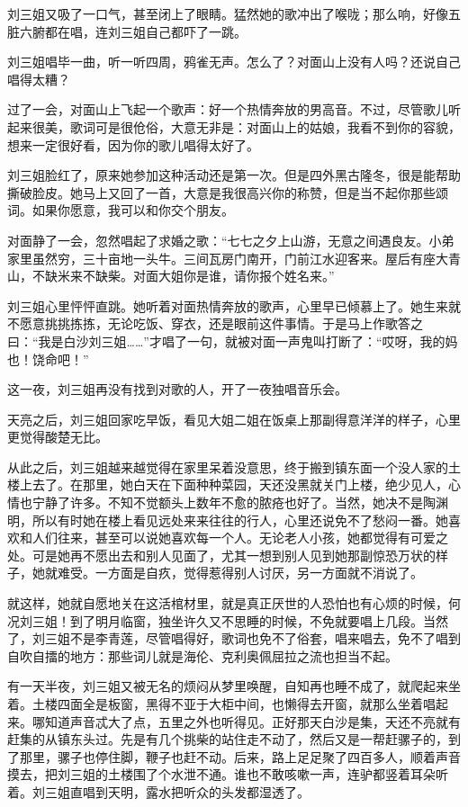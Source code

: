  刘三姐又吸了一口气，甚至闭上了眼睛。猛然她的歌冲出了喉咙；那么响，好像五脏六腑都在唱，连刘三姐自己都吓了一跳。 
 
 刘三姐唱毕一曲，听一听四周，鸦雀无声。怎么了？对面山上没有人吗？还说自己唱得太糟？ 
 
 过了一会，对面山上飞起一个歌声：好一个热情奔放的男高音。不过，尽管歌儿听起来很美，歌词可是很伧俗，大意无非是：对面山上的姑娘，我看不到你的容貌，想来一定很好看，因为你的歌儿唱得太好了。 
 
 刘三姐脸红了，原来她参加这种活动还是第一次。但是四外黑古隆冬，很是能帮助撕破脸皮。她马上又回了一首，大意是我很高兴你的称赞，但是当不起你那些颂词。如果你愿意，我可以和你交个朋友。 
 
 对面静了一会，忽然唱起了求婚之歌：“七七之夕上山游，无意之间遇良友。小弟家里虽然穷，三十亩地一头牛。三间瓦房门南开，门前江水迎客来。屋后有座大青山，不缺米来不缺柴。对面大姐你是谁，请你报个姓名来。” 
 
 刘三姐心里怦怦直跳。她听着对面热情奔放的歌声，心里早已倾慕上了。她生来就不愿意挑挑拣拣，无论吃饭、穿衣，还是眼前这件事情。于是马上作歌答之曰：“我是白沙刘三姐……”才唱了一句，就被对面一声鬼叫打断了：“哎呀，我的妈也！饶命吧！” 
 
 这一夜，刘三姐再没有找到对歌的人，开了一夜独唱音乐会。 
 
 天亮之后，刘三姐回家吃早饭，看见大姐二姐在饭桌上那副得意洋洋的样子，心里更觉得酸楚无比。 
 
 从此之后，刘三姐越来越觉得在家里呆着没意思，终于搬到镇东面一个没人家的土楼上去了。在那里，她白天在下面种种菜园，天还没黑就关门上楼，绝少见人，心情也宁静了许多。不知不觉额头上数年不愈的脓疮也好了。当然，她决不是陶渊明，所以有时她在楼上看见远处来来往往的行人，心里还说免不了愁闷一番。她喜欢和人们往来，甚至可以说她喜欢每一个人。无论老人小孩，她都觉得有可爱之处。可是她再不愿出去和别人见面了，尤其一想到别人见到她那副惊恐万状的样子，她就难受。一方面是自疚，觉得惹得别人讨厌，另一方面就不消说了。 
 
 就这样，她就自愿地关在这活棺材里，就是真正厌世的人恐怕也有心烦的时候，何况刘三姐！到了明月临窗，独坐许久又不思睡的时候，不免就要唱上几段。当然了，刘三姐不是李青莲，尽管唱得好，歌词也免不了俗套，唱来唱去，免不了唱到自吹自擂的地方：那些词儿就是海伦、克利奥佩屈拉之流也担当不起。 
 
 有一天半夜，刘三姐又被无名的烦闷从梦里唤醒，自知再也睡不成了，就爬起来坐着。土楼四面全是板窗，黑得不亚于大柜中间，也懒得去开窗，就那么坐着唱起来。哪知道声音忒大了点，五里之外也听得见。正好那天白沙是集，天还不亮就有赶集的从镇东头过。先是有几个挑柴的站住走不动了，然后又是一帮赶骡子的，到了那里，骡子也停住脚，鞭子也赶不动。后来，路上足足聚了四百多人，顺着声音摸去，把刘三姐的土楼围了个水泄不通。谁也不敢咳嗽一声，连驴都竖着耳朵听着。刘三姐直唱到天明，露水把听众的头发都湿透了。 
 
